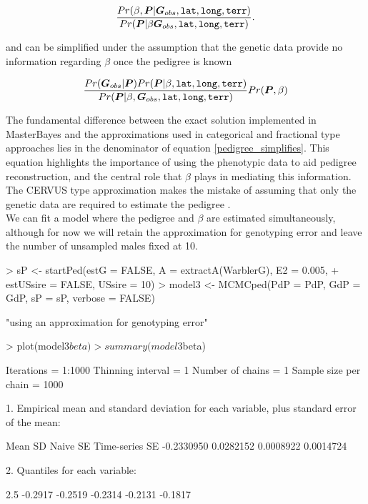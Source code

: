 \documentclass{article}
\begin{document}
\begin{equation}
\frac{Pr(\beta,  {\bm P}| {\bm G}_{obs}, \textrm{\texttt{lat}}, \textrm{\texttt{long}}, \textrm{\texttt{terr}})}{Pr({\bm P}| \beta {\bm G}_{obs}, \textrm{\texttt{lat}}, \textrm{\texttt{long}}, \textrm{\texttt{terr}})}.
\label{pedigree_expanded}
\end{equation}

and can be simplified  under the assumption that the genetic data provide no information regarding $\beta$ once the pedigree is known

\begin{equation}
\frac{Pr({\bm G}_{obs} | {\bm P})Pr({\bm P} | \beta,\textrm{\texttt{lat}}, \textrm{\texttt{long}}, \textrm{\texttt{terr}})}{Pr({\bm P}| \beta, {\bm G}_{obs}, \textrm{\texttt{lat}}, \textrm{\texttt{long}}, \textrm{\texttt{terr}})}Pr({\bm P}, \beta)
\label{pedigree_simplifies}
\end{equation}

The fundamental difference between the exact solution implemented in MasterBayes and the approximations used in categorical and fractional type approaches lies in the denominator of equation \ref{pedigree_simplifies}.  This equation highlights the importance of using the phenotypic data to aid pedigree reconstruction, and the central role that $\beta$ plays in mediating this information.  The CERVUS type approximation makes the mistake of assuming that only the genetic data are required to estimate the pedigree \citep[see the information boxes in][]{Hadfield.2006c}.\\

  We can fit a model where the pedigree and $\beta$ are estimated simultaneously, although for now we will retain the approximation for genotyping error and leave the number of unsampled males fixed at 10.

\begin{Schunk}
\begin{Sinput}
> sP <- startPed(estG = FALSE, A = extractA(WarblerG), E2 = 0.005, 
+     estUSsire = FALSE, USsire = 10)
> model3 <- MCMCped(PdP = PdP, GdP = GdP, sP = sP, verbose = FALSE)
\end{Sinput}
\begin{Soutput}
[1] "using an approximation for genotyping error"
\end{Soutput}
\begin{Sinput}
> plot(model3$beta)
> summary(model3$beta)
\end{Sinput}
\begin{Soutput}
Iterations = 1:1000
Thinning interval = 1 
Number of chains = 1 
Sample size per chain = 1000 

1. Empirical mean and standard deviation for each variable,
   plus standard error of the mean:

          Mean             SD       Naive SE Time-series SE 
    -0.2330950      0.0282152      0.0008922      0.0014724 

2. Quantiles for each variable:

   2.5%
-0.2917 -0.2519 -0.2314 -0.2131 -0.1817 
\end{Soutput}
\end{Schunk}
 
\end{document}

